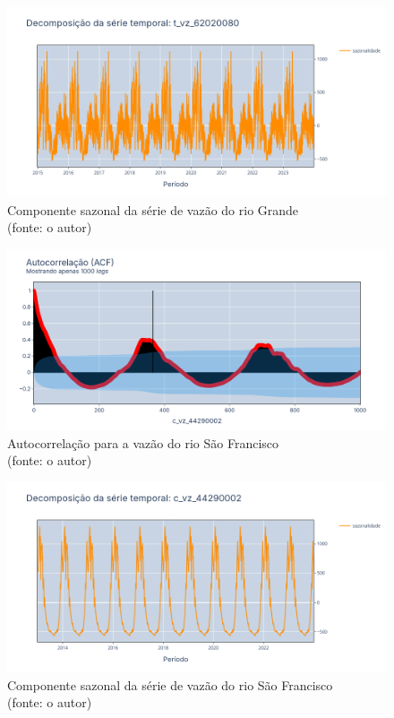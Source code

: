 \begin{figure}[!h]
	\centering
	\includegraphics[scale=0.33]{Figuras/rio_grande/sazonalidade_rio_grande.png}
	\caption{Componente sazonal da série de vazão do rio Grande\\(fonte: o autor)}
	\label{fig:sazonalidade_rio_grande}
\end{figure}

\begin{figure}[!h]
	\centering
	\includegraphics[scale=0.33]{Figuras/rio_sao_francisco/acf_rio_sao_francisco.png}
	\caption{Autocorrelação para a vazão do rio São Francisco\\(fonte: o autor)}
	\label{fig:acf_rio_sao_francisco}
\end{figure}

\begin{figure}[!h]
	\centering
	\includegraphics[scale=0.33]{Figuras/rio_sao_francisco/sazonalidade_rio_sao_francisco.png}
	\caption{Componente sazonal da série de vazão do rio São Francisco\\(fonte: o autor)}
	\label{fig:sazonalidade_rio_sao_francisco}
\end{figure}

